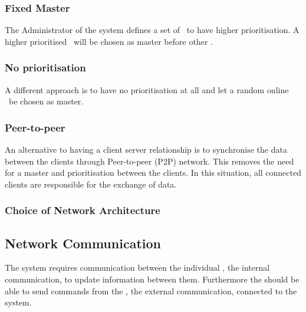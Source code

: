 \subsubsection{Fixed Master}
The Administrator of the system defines a set of \phones~to have higher prioritisation. A higher prioritised \phone~will be chosen as master before other \phone.

\subsubsection{No prioritisation}
A different approach is to have no prioritisation at all and let a random online \phone~be chosen as master. 

\subsubsection{Peer-to-peer}
An alternative to having a client server relationship is to synchronise the data between the clients through Peer-to-peer (P2P) network. This removes the need for a master and prioritisation between the clients. In this situation, all connected clients are responsible for the exchange of data. 

\subsubsection{Choice of Network Architecture}


\subsection{Network Communication}
The system requires communication between the individual \phones, the internal communication, to update information between them. Furthermore the \phones should be able to send commands from the \sdevs, the external communication, connected to the system.

